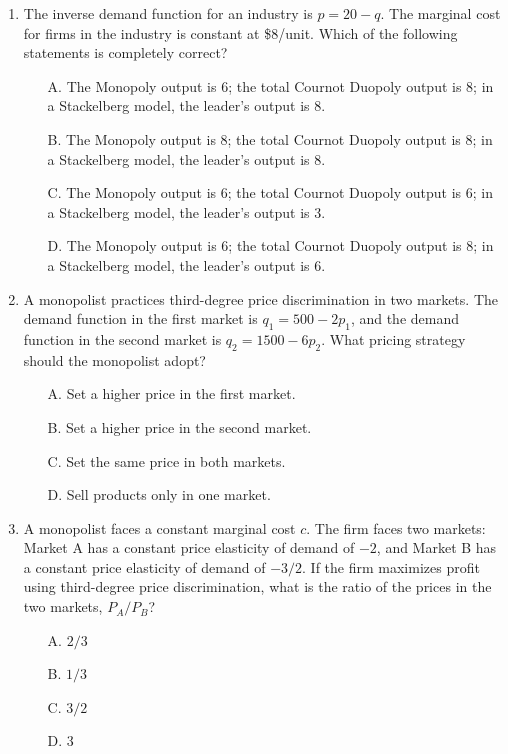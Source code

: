 \documentclass[12pt, a4paper]{article}
\begin{document}
\begin{enumerate}
\item The inverse demand function for an industry is $p = 20 - q$. The marginal cost for firms in the industry is constant at \$8/unit. Which of the following statements is completely correct?
    \begin{itemize}
        \item[A.] The Monopoly output is 6; the total Cournot Duopoly output is 8; in a Stackelberg model, the leader's output is 8.
        \item[B.] The Monopoly output is 8; the total Cournot Duopoly output is 8; in a Stackelberg model, the leader's output is 8.
        \item[C.] The Monopoly output is 6; the total Cournot Duopoly output is 6; in a Stackelberg model, the leader's output is 3.
        \item[D.] The Monopoly output is 6; the total Cournot Duopoly output is 8; in a Stackelberg model, the leader's output is 6.
    \end{itemize}

\item A monopolist practices third-degree price discrimination in two markets. The demand function in the first market is $q_1 = 500 - 2p_1$, and the demand function in the second market is $q_2 = 1500 - 6p_2$. What pricing strategy should the monopolist adopt?
    \begin{itemize}
        \item[A.] Set a higher price in the first market.
        \item[B.] Set a higher price in the second market.
        \item[C.] Set the same price in both markets.
        \item[D.] Sell products only in one market.
    \end{itemize}

\item A monopolist faces a constant marginal cost $c$. The firm faces two markets: Market A has a constant price elasticity of demand of $-2$, and Market B has a constant price elasticity of demand of $-3/2$. If the firm maximizes profit using third-degree price discrimination, what is the ratio of the prices in the two markets, $P_A / P_B$?
    \begin{itemize}
        \item[A.] $2/3$
        \item[B.] $1/3$
        \item[C.] $3/2$
        \item[D.] $3$
    \end{itemize}


\end{enumerate}
\end{document}
